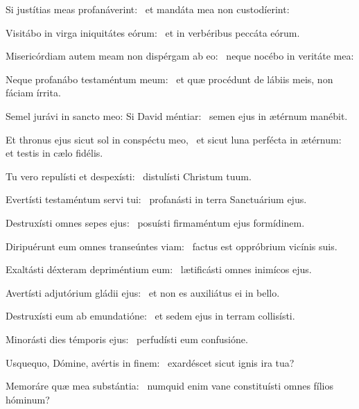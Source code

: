 \item Si justítias meas profanáve\-rint:~\psstar{} et mandáta mea non custodíerint:

\item Visitábo in virga iniquitátes eórum:~\psstar{} et in verbéribus peccáta eórum.

\item Misericórdiam autem meam non dispérgam ab eo:~\psstar{} neque nocébo in veritáte mea:

\item Neque profanábo testaméntum meum:~\psstar{} et quæ procédunt de lábiis meis, non fáciam írrita.

\item Semel jurávi in sancto meo: Si David méntiar:~\psstar{} semen ejus in ætérnum manébit.

\item Et thronus ejus sicut sol in conspéctu meo,~\pscross{} et sicut luna perfécta in ætérnum:~\psstar{} et testis in cælo fidélis.

\item Tu vero repulísti et despexísti:~\psstar{} distulísti Christum tuum.

\item Evertísti testaméntum servi tui:~\psstar{} profanásti in terra Sanctuárium ejus.

\item Destruxísti omnes sepes ejus:~\psstar{} posuísti firmaméntum ejus formídinem.

\item Diripuérunt eum omnes transeúntes viam:~\psstar{} factus est oppróbrium vicínis suis.

\item Exaltásti déxteram depriméntium eum:~\psstar{} lætificásti omnes inimícos ejus.

\item Avertísti adjutórium gládii ejus:~\psstar{} et non es auxiliátus ei in bello.

\item Destruxísti eum ab emundatióne:~\psstar{} et sedem ejus in terram collisísti.

\item Minorásti dies témporis ejus:~\psstar{} perfudísti eum confusióne.

\item Usquequo, Dómine, avértis in finem:~\psstar{} exardéscet sicut ignis ira tua?

\item Memoráre quæ mea substán\-tia:~\psstar{} numquid enim vane constituísti omnes fílios hóminum?

